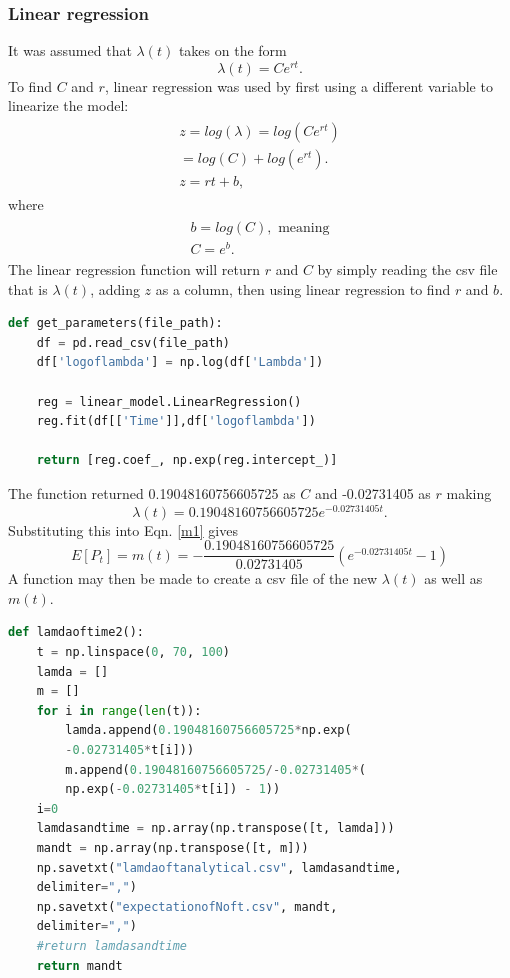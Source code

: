 \documentclass{article}
\begin{document}
\subsubsection{Linear regression}
It was assumed that $\lambda(t)$ takes on the form
\begin{equation}\label{lambda2}
\lambda(t) = Ce^{rt}.
\end{equation}
To find $C$ and $r$, linear regression was used by first using a different variable to linearize the model:
\begin{align}\label{expectation}
\begin{split}
z = log(\lambda) = log(Ce^{rt})
\\
= log(C) + log(e^{rt}).
\\
z = rt + b,
\end{split}
\end{align}
where
\begin{align}\label{bandc}
\begin{split}
b = log(C), \text{ meaning}
\\
C = e^b.
\end{split}
\end{align}
The linear regression function will return $r$ and $C$ by simply reading the csv file that is $\lambda(t)$, adding $z$ as a column, then using linear regression to find $r$ and $b$.
\begin{lstlisting}[language=Python]
def get_parameters(file_path):
    df = pd.read_csv(file_path)
    df['logoflambda'] = np.log(df['Lambda'])

    reg = linear_model.LinearRegression()
    reg.fit(df[['Time']],df['logoflambda'])

    return [reg.coef_, np.exp(reg.intercept_)]
\end{lstlisting}

The function returned 0.19048160756605725 as $C$ and -0.02731405 as $r$ making
\begin{equation}\label{lambda3}
\lambda(t) = 0.19048160756605725e^{-0.02731405t}.
\end{equation}
Substituting this into Eqn. \ref{m1} gives
\begin{equation}\label{m2}
E[P_t] = m(t) = -\frac{0.19048160756605725}{0.02731405}(e^{-0.02731405t} - 1)
\end{equation}
A function may then be made to create a csv file of the new $\lambda(t)$ as well as $m(t)$.

\begin{lstlisting}[language=Python]
def lamdaoftime2():
    t = np.linspace(0, 70, 100)
    lamda = []
    m = []
    for i in range(len(t)):
        lamda.append(0.19048160756605725*np.exp(
        -0.02731405*t[i]))
        m.append(0.19048160756605725/-0.02731405*(
        np.exp(-0.02731405*t[i]) - 1))
    i=0
    lamdasandtime = np.array(np.transpose([t, lamda]))
    mandt = np.array(np.transpose([t, m]))
    np.savetxt("lamdaoftanalytical.csv", lamdasandtime,
    delimiter=",")
    np.savetxt("expectationofNoft.csv", mandt, 
    delimiter=",")
    #return lamdasandtime
    return mandt
\end{lstlisting}
\end{document}
